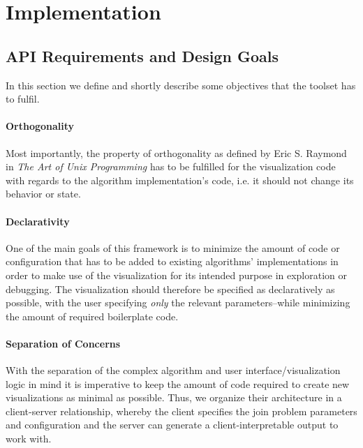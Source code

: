 \section{Implementation}
\label{sec:implementation}

\subsection{API Requirements and Design Goals}
\label{subsub:api-requirements-goals}

In this section we define and shortly describe some objectives that the toolset has to fulfil. 

\paragraph{Orthogonality}
Most importantly, the property  of orthogonality 
as defined by Eric S. Raymond in \textit{The Art of Unix
Programming} \cite{raymond2003compactness} has to be fulfilled for the visualization code with regards to the algorithm implementation's code, i.e. it should not change its behavior or state.

\paragraph{Declarativity} One of the main goals of this framework is to minimize 
the amount of code or configuration that has to be added to existing algorithms' implementations in order to make use of the visualization for its intended purpose in exploration or debugging. The visualization should therefore be specified as declaratively as 
possible, with the user specifying \textit{only} the relevant parameters–while minimizing the amount of required boilerplate code.


\paragraph{Separation of Concerns}
With the separation of the complex algorithm and user interface/visualization logic in mind it is imperative to keep the amount of code required to create new visualizations as minimal as possible. 
Thus, we organize their architecture in a client-server 
relationship, whereby the client specifies the join 
problem parameters and configuration and the server can
generate a client-interpretable output to work with.

